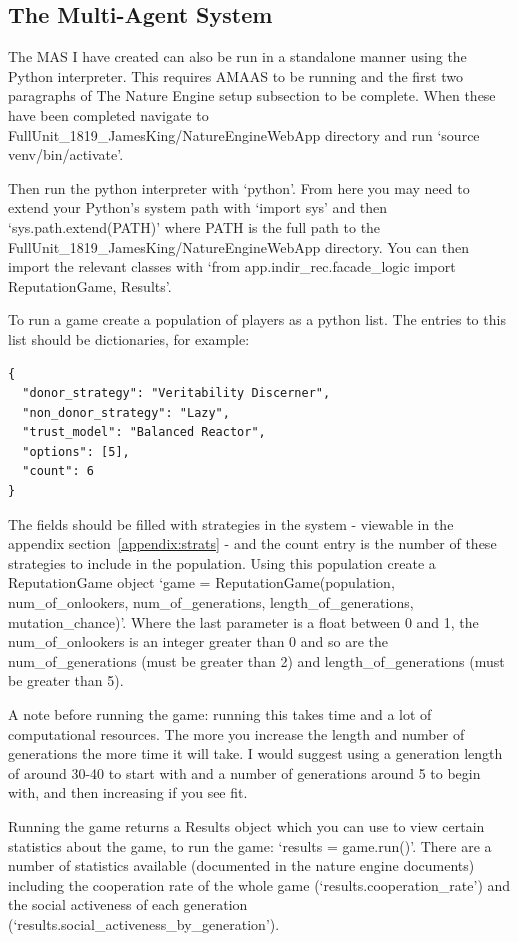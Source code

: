 \documentclass[]{final_report}
\begin{document}
\subsection{The Multi-Agent System}
The MAS I have created can also be run in a standalone manner using the Python interpreter. This requires AMAAS to be running and the first two paragraphs of The Nature Engine setup subsection to be complete. When these have been completed navigate to  FullUnit\_1819\_JamesKing/NatureEngineWebApp directory and run `source venv/bin/activate'.\par 
Then run the python interpreter with `python'. From here you may need to extend your Python's system path with `import sys' and then `sys.path.extend(PATH)' where PATH is the full path to the FullUnit\_1819\_JamesKing/NatureEngineWebApp directory. You can then import the relevant classes with `from app.indir\_rec.facade\_logic import ReputationGame, Results'.\par 
To run a game create a population of players as a python list. The entries to this list should be dictionaries, for example:
\begin{verbatim}
{
  "donor_strategy": "Veritability Discerner",
  "non_donor_strategy": "Lazy",
  "trust_model": "Balanced Reactor",
  "options": [5],
  "count": 6
}
\end{verbatim}
The fields should be filled with strategies in the system - viewable in the appendix section~\ref{appendix:strats} - and the count entry is the number of these strategies to include in the population. Using this population create a ReputationGame object `game = ReputationGame(population, num\_of\_onlookers, num\_of\_generations, length\_of\_generations, mutation\_chance)'. Where the last parameter is a float between 0 and 1, the num\_of\_onlookers is an integer greater than 0 and so are the num\_of\_generations (must be greater than 2) and length\_of\_generations (must be greater than 5).\par 
A note before running the game: running this takes time and a lot of computational resources. The more you increase the length and number of generations the more time it will take. I would suggest using a generation length of around 30-40 to start with and a number of generations around 5 to begin with, and then increasing if you see fit.\par 
Running the game returns a Results object which you can use to view certain statistics about the game, to run the game: `results = game.run()'. There are a number of statistics available (documented in the nature engine documents) including the cooperation rate of the whole game (`results.cooperation\_rate') and the social activeness of each generation (`results.social\_activeness\_by\_generation').
\end{document}
